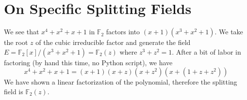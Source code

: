 \documentclass[12pt]{article}
\newcommand*{\F}{\mathbb{F}}
\begin{document}
\section{On Specific Splitting Fields}
We see that $x^4 + x^2 + x + 1$ in $\F_2$ factors into $(x + 1)(x^3 + x^2 + 1)$. We take the root $z$ of the cubic irreducible factor and generate the field $E = \F_2[x] / (x^3 + x^2 + 1) = \F_2(z)$ where $z^3 + z^2 = 1$. After a bit of labor in factoring (by hand this time, no Python script), we have
\[x^4 + x^2 + x + 1 = (x + 1)(x + z)(x + z^2)(x + (1 + z + z^2))\]
We have shown a linear factorization of the polynomial, therefore the splitting field is $\F_2(z)$.
\end{document}
